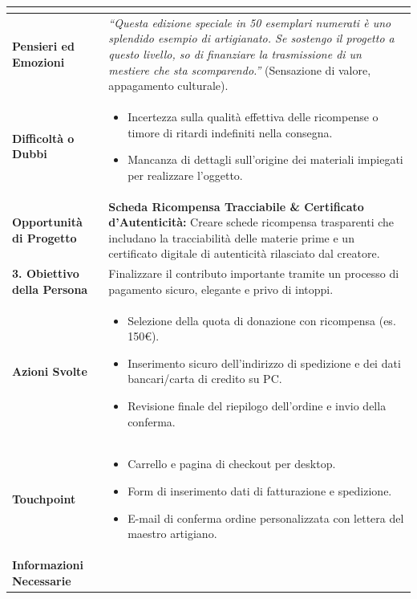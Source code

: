 \documentclass[11pt,a4paper]{article}
\begin{document}
\begin{table}[h!]
\begin{tabular}{|p{3.2cm}|p{11.8cm}|}
\begin{itemize}[leftmargin=*,nosep]
\end{itemize} \\ \hline
\textbf{Pensieri ed Emozioni} &
\textit{``Questa edizione speciale in 50 esemplari numerati è uno splendido esempio di artigianato. Se sostengo il progetto a questo livello, so di finanziare la trasmissione di un mestiere che sta scomparendo.''} (Sensazione di valore, appagamento culturale). \\ \hline
\textbf{Difficoltà o Dubbi} &
\begin{itemize}[leftmargin=*,nosep]
    \item Incertezza sulla qualità effettiva delle ricompense o timore di ritardi indefiniti nella consegna.
    \item Mancanza di dettagli sull'origine dei materiali impiegati per realizzare l'oggetto.
\end{itemize} \\ \hline
\textbf{Opportunità di Progetto} &
\textbf{Scheda Ricompensa Tracciabile \& Certificato d'Autenticità:} Creare schede ricompensa trasparenti che includano la tracciabilità delle materie prime e un certificato digitale di autenticità rilasciato dal creatore. \\ \hline
\hline
\textbf{3. Obiettivo della Persona} & Finalizzare il contributo importante tramite un processo di pagamento sicuro, elegante e privo di intoppi. \\ \hline
\textbf{Azioni Svolte} &
\begin{itemize}[leftmargin=*,nosep]
    \item Selezione della quota di donazione con ricompensa (es. 150€).
    \item Inserimento sicuro dell'indirizzo di spedizione e dei dati bancari/carta di credito su PC.
    \item Revisione finale del riepilogo dell'ordine e invio della conferma.
\end{itemize} \\ \hline
\textbf{Touchpoint} &
\begin{itemize}[leftmargin=*,nosep]
    \item Carrello e pagina di checkout per desktop.
    \item Form di inserimento dati di fatturazione e spedizione.
    \item E-mail di conferma ordine personalizzata con lettera del maestro artigiano.
\end{itemize} \\ \hline
\textbf{Informazioni Necessarie} &
\begin{itemize}[leftmargin=*,nosep]

\end{itemize}
\end{tabular}
\end{table}
\end{document}
